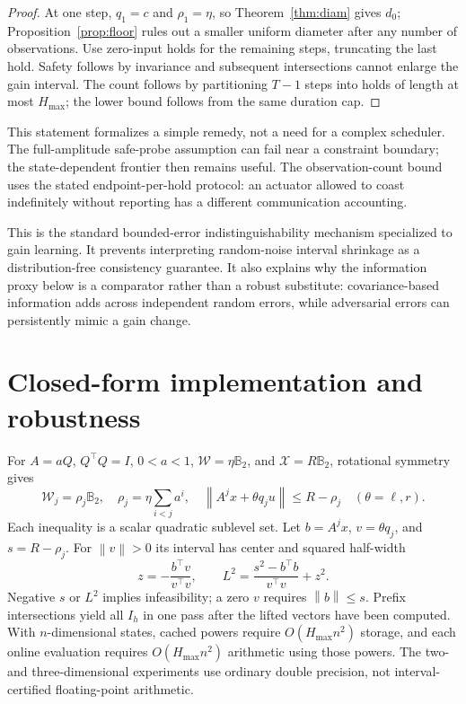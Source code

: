 \documentclass{l4dc2026}
\newcommand{\W}{\mathcal{W}}
\newcommand{\X}{\mathcal{X}}
\newcommand{\norm}[1]{\left\lVert #1\right\rVert}
\begin{document}
\begin{proof}
At one step, $q_1=c$ and $\rho_1=\eta$, so Theorem~\ref{thm:diam} gives $d_0$; Proposition~\ref{prop:floor} rules out a smaller uniform diameter after any number of observations. Use zero-input holds for the remaining steps, truncating the last hold. Safety follows by invariance and subsequent intersections cannot enlarge the gain interval. The count follows by partitioning $T-1$ steps into holds of length at most $H_{\max}$; the lower bound follows from the same duration cap.
\end{proof}
This statement formalizes a simple remedy, not a need for a complex scheduler. The full-amplitude safe-probe assumption can fail near a constraint boundary; the state-dependent frontier then remains useful. The observation-count bound uses the stated endpoint-per-hold protocol: an actuator allowed to coast indefinitely without reporting has a different communication accounting.

This is the standard bounded-error indistinguishability mechanism specialized to gain learning. It prevents interpreting random-noise interval shrinkage as a distribution-free consistency guarantee. It also explains why the information proxy below is a comparator rather than a robust substitute: covariance-based information adds across independent random errors, while adversarial errors can persistently mimic a gain change.

\section{Closed-form implementation and robustness}
For $A=aQ$, $Q^\top Q=I$, $0<a<1$, $\W=\eta\mathbb B_2$, and $\X=R\mathbb B_2$, rotational symmetry gives
\begin{equation}\label{eq:rho}
 \W_j=\rho_j\mathbb B_2,\quad \rho_j=\eta\sum_{i<j}a^i,\quad
 \norm{A^jx+\theta q_ju}\le R-\rho_j\quad(\theta=\ell,r).
\end{equation}
Each inequality is a scalar quadratic sublevel set. Let $b=A^jx$, $v=\theta q_j$, and $s=R-\rho_j$. For $\norm{v}>0$ its interval has center and squared half-width
\begin{equation}\label{eq:quad}
 z=-\frac{b^\top v}{v^\top v},\qquad
 L^2=\frac{s^2-b^\top b}{v^\top v}+z^2.
\end{equation}
Negative $s$ or $L^2$ implies infeasibility; a zero $v$ requires $\norm{b}\le s$. Prefix intersections yield all $I_h$ in one pass after the lifted vectors have been computed. With $n$-dimensional states, cached powers require $O(H_{\max}n^2)$ storage, and each online evaluation requires $O(H_{\max}n^2)$ arithmetic using those powers. The two- and three-dimensional experiments use ordinary double precision, not interval-certified floating-point arithmetic.
\end{document}
